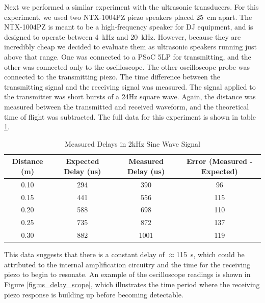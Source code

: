 \documentclass{article}
\begin{document}
    Next we performed a similar experiment with the ultrasonic transducers. For this experiment, we used two NTX-1004PZ piezo speakers placed \SI{25}{\centi\meter} apart. The NTX-1004PZ is meant to be a high-frequency speaker for DJ equipment, and is designed to operate between \SI{4}{\kilo\hertz} and \SI{20}{\kilo\hertz}. However, because they are incredibly cheap we decided to evaluate them as ultrasonic speakers running just above that range. One was connected to a PSoC 5LP for transmitting, and the other was connected only to the oscilloscope. The other oscilloscope probe was connected to the transmitting piezo. The time difference between the transmitting signal and the receiving signal was measured. The signal applied to the transmitter was short bursts of a 24Hz square wave. Again, the distance was measured between the transmitted and received waveform, and the theoretical time of flight was subtracted. The full data for this experiment is shown in table \ref{table:us_delay}.

    \begin{table}[H]
      \centering
      \begin{tabular}{|c|c|c|c|}\hline
        Distance (m) & Expected Delay (us) & Measured Delay (us) & Error (Measured - Expected) \\ \hline
        0.10 & 294 &  390 &  96 \\ \hline
        0.15 & 441 &  556 & 115 \\ \hline
        0.20 & 588 &  698 & 110 \\ \hline
        0.25 & 735 &  872 & 137 \\ \hline
        0.30 & 882 & 1001 & 119 \\ \hline
      \end{tabular}
      \caption{Measured Delays in 2kHz Sine Wave Signal}
      \label{table:us_delay}
    \end{table}

    This data suggests that there is a constant delay of $\approx$\SI{115}{\second}, which could be attributed to the internal amplification circuitry and the time for the receiving piezo to begin to resonate. An example of the oscilloscope readings is shown in Figure \ref{fig:us_delay_scope}, which illustrates the time period where the receiving piezo response is building up before becoming detectable.
\end{document}
